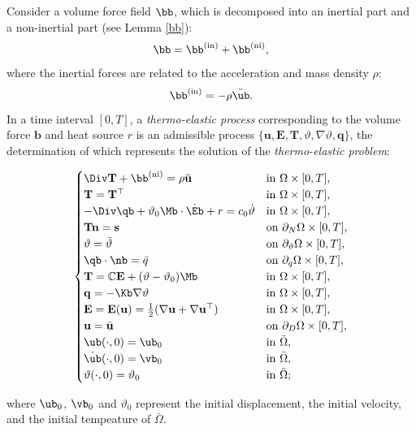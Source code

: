 Consider a volume force field $\bb$, which is decomposed into an inertial part and a non-inertial part (see Lemma \ref{bb}):
\begin{equation}
	\bb = \bb^{({\rm in})} + \bb^{({\rm ni})},
\end{equation}
where the inertial forces are related to the acceleration and mass density $\rho$:
\begin{equation}
	\bb^{({\rm in})} = -\rho \ddot{\ub}.
\end{equation}
In a time interval $[0,T]$, a \textit{thermo-elastic process} corresponding to the volume force \( \mathbf{b} \) and heat source \( r \) is an admissible process \( \{ \mathbf{u}, \mathbf{E}, \mathbf{T}, \vartheta, \nabla\vartheta, \mathbf{q} \} \), the determination of which represents the solution of the \textit{thermo-elastic problem}:
\begin{definition}
	\begin{equation}
		\begin{cases}
			\Div \mathbf{T} + \bb^{({\rm ni})} = \rho \ddot{\mathbf{u}} & \mathrm{in~}\Omega \times [0,T],\\
			\mathbf{T} = \mathbf{T}^\top & \mathrm{in~}\Omega \times [0,T],\\
			-\Div \qb + \vartheta_0 \Mb \cdot \dot \Eb + r = c_0 \dot{\vartheta} & \mathrm{in~}\Omega \times [0,T],\\
			\mathbf{T} \mathbf{n} = \mathbf{s} & \mathrm{on~}\partial_{N}\Omega \times [0,T],\\
			\vartheta = \bar{\vartheta} & \mathrm{on~}\partial_{\vartheta}\Omega \times [0,T],\\
			\qb \cdot \nb = \bar{q} & \mathrm{on~}\partial_{q}\Omega \times [0,T],\\
			\mathbf{T} = \mathbb{C} \mathbf{E} + (\vartheta - \vartheta_0) \Mb & \mathrm{in~}\Omega \times [0,T],\\
			\mathbf{q} = -\Kb \nabla \vartheta & \mathrm{in~}\Omega \times [0,T],\\
			\mathbf{E} = \mathbf{E}(\mathbf{u}) = \frac{1}{2} (\nabla \mathbf{u} + \nabla \mathbf{u}^\top) & \mathrm{in~}\Omega \times [0,T],\\
			\mathbf{u} = \bar{\mathbf{u}} & \mathrm{on~}\partial_{D}\Omega \times [0,T],\\
			\ub(\cdot, 0) = \ub_0 & \mathrm{in~}\bar\Omega, \\
			\dot{\ub}(\cdot, 0) = \vb_0 & \mathrm{in~}\bar\Omega,\\
			\vartheta(\cdot, 0) = \vartheta_0 & \mathrm{in~}\bar\Omega;
		\end{cases}
	\end{equation}
\end{definition}
where $\ub_0$, $\vb_0$ and $\vartheta_0$ represent the initial displacement, the initial velocity, and the initial tempeature of $\bar{\Omega}$.

